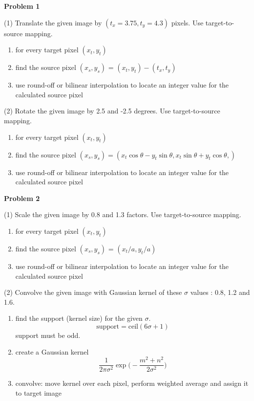\documentclass[12pt]{article}
\begin{document}
\noindent
\textbf{Problem 1}

\noindent
(1) Translate the given image by \((t_x=3.75,t_y=4.3)\) pixels. Use 
target-to-source mapping.
\begin{enumerate}
\item for every target pixel \((x_t,y_t)\)
\item find the source pixel \((x_s,y_s)\) = \((x_t,y_t) - (t_x,t_y)\)
\item use round-off or bilinear interpolation to locate an integer
value for the calculated source pixel
\end{enumerate}

\noindent
(2) Rotate the given image by 2.5 and -2.5 degrees. Use 
target-to-source mapping.
\begin{enumerate}
\item for every target pixel \((x_t,y_t)\)
\item find the source pixel \((x_s,y_s) = 
(x_t \cos{\theta} - y_t \sin{\theta}, 
x_t \sin{\theta} + y_t \cos{\theta},)\)
\item use round-off or bilinear interpolation to locate an integer
value for the calculated source pixel
\end{enumerate}

\noindent
\textbf{Problem 2}

\noindent
(1) Scale the given image by 0.8 and 1.3 factors. Use 
target-to-source mapping.
\begin{enumerate}
\item for every target pixel \((x_t,y_t)\)
\item find the source pixel \((x_s,y_s)\) = \((x_t/a,y_t/a)\)
\item use round-off or bilinear interpolation to locate an integer
value for the calculated source pixel
\end{enumerate}

\noindent
(2) Convolve the given image with Gaussian kernel of these 
\(\sigma\) values : 0.8, 1.2 and 1.6.
\begin{enumerate}
\item find the support (kernel size) for the given \(\sigma\).
\[\text{support} = \text{ceil}(6 \sigma + 1)\] support must be odd.
\item create a Gaussian kernel
\[\frac{1}{2 \pi \sigma^2} 
\exp{\bigg(-\frac{m^2+n^2}{2 \sigma^2}\bigg)}\]
\item convolve: move kernel over each pixel, perform weighted average 
and assign it to target image
\end{enumerate}
\end{document}
